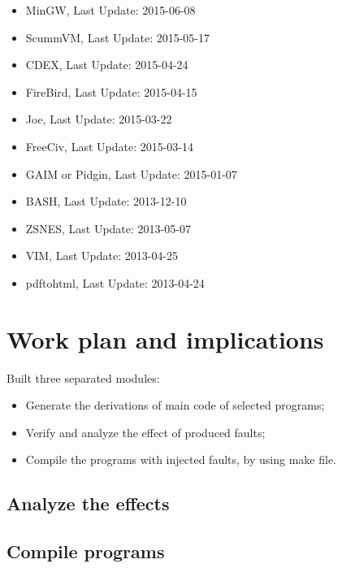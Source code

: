 \begin{itemize}
	\item MinGW, Last Update: 2015-06-08
	\item ScummVM, Last Update: 2015-05-17
	\item CDEX, Last Update: 2015-04-24
	\item FireBird, Last Update: 2015-04-15
	\item Joe, Last Update: 2015-03-22
	\item FreeCiv, Last Update: 2015-03-14
	\item GAIM or Pidgin, Last Update: 2015-01-07
	\item BASH, Last Update: 2013-12-10
	\item ZSNES, Last Update: 2013-05-07
	\item VIM, Last Update: 2013-04-25
	\item pdftohtml, Last Update: 2013-04-24
\end{itemize}

\newpage
\section{Work plan and implications}

Built three separated modules:

\begin{itemize}
	\item Generate the derivations of main code of selected programs;
	\item Verify and analyze the effect of produced faults;
	\item Compile the programs with injected faults, by using make file.
\end{itemize}

\subsection{Analyze the effects}





\subsection{Compile programs}



